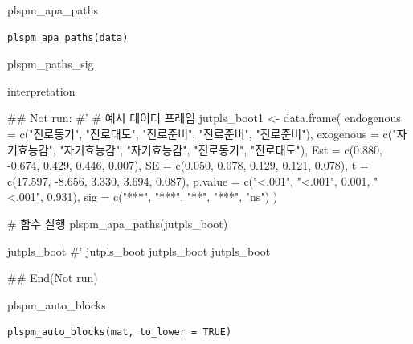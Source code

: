 \documentclass[a4paper]{book}
\begin{document}
%
\begin{Description}
plspm\_apa\_paths
\end{Description}
%
\begin{Usage}
\begin{verbatim}
plspm_apa_paths(data)
\end{verbatim}
\end{Usage}
%
\begin{Arguments}
\begin{ldescription}
\item[\code{data}] plspm\_paths\_sig
\end{ldescription}
\end{Arguments}
%
\begin{Value}
interpretation
\end{Value}
%
\begin{Examples}
\begin{ExampleCode}

## Not run: 
#'
# 예시 데이터 프레임
jutpls_boot1 <- data.frame(
  endogenous = c("진로동기", "진로태도", "진로준비", "진로준비", "진로준비"),
  exogenous = c("자기효능감", "자기효능감", "자기효능감", "진로동기", "진로태도"),
  Est = c(0.880, -0.674, 0.429, 0.446, 0.007),
  SE = c(0.050, 0.078, 0.129, 0.121, 0.078),
  t = c(17.597, -8.656, 3.330, 3.694, 0.087),
  p.value = c("<.001", "<.001", 0.001, "<.001", 0.931),
  sig = c("***", "***", "**", "***", "ns")
)

# 함수 실행
plspm_apa_paths(jutpls_boot)

jutpls_boot %
#'
jutpls_boot %
jutpls_boot %
jutpls_boot %



## End(Not run)

\end{ExampleCode}
\end{Examples}
%
\begin{Description}
plspm\_auto\_blocks
\end{Description}
%
\begin{Usage}
\begin{verbatim}
plspm_auto_blocks(mat, to_lower = TRUE)
\end{verbatim}
\end{Usage}
\end{document}
